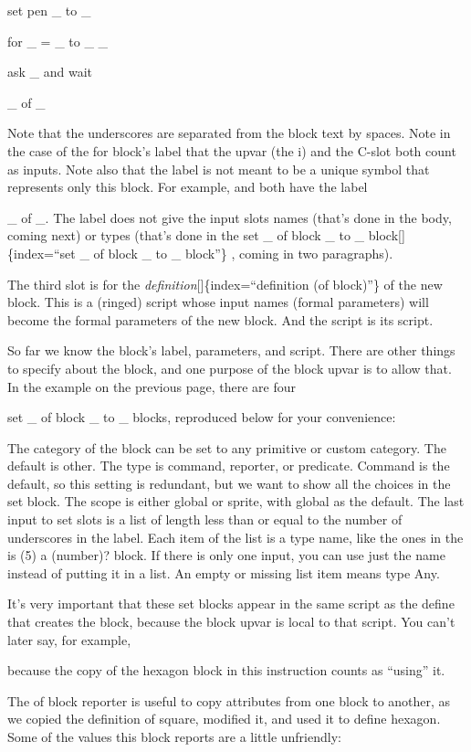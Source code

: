 \documentclass[
  letterpaper,
]{book}
\begin{document}
set pen \_ to \_

for \_ = \_ to \_ \_

ask \_ and wait

\_ of \_

Note that the underscores are separated from the block text by spaces.
Note in the case of the for block's label that the upvar (the i) and the
C-slot both count as inputs. Note also that the label is not meant to be
a unique symbol that represents only this block. For example, and both
have the label

\_ of \_. The label does not give the input slots names (that's done in
the body, coming next) or types (that's done in the set \_ of block \_
to \_ block{[}{]}\{index=``set \_ of block \_ to \_ block''\} , coming
in two paragraphs).

The third slot is for the \emph{definition}{[}{]}\{index=``definition
(of block)''\} of the new block. This is a (ringed) script whose input
names (formal parameters) will become the formal parameters of the new
block. And the script is its script.

So far we know the block's label, parameters, and script. There are
other things to specify about the block, and one purpose of the block
upvar is to allow that. In the example on the previous page, there are
four

set \_ of block \_ to \_ blocks, reproduced below for your convenience:

The category of the block can be set to any primitive or custom
category. The default is other. The type is command, reporter, or
predicate. Command is the default, so this setting is redundant, but we
want to show all the choices in the set block. The scope is either
global or sprite, with global as the default. The last input to set
slots is a list of length less than or equal to the number of
underscores in the label. Each item of the list is a type name, like the
ones in the is (5) a (number)? block. If there is only one input, you
can use just the name instead of putting it in a list. An empty or
missing list item means type Any.

It's very important that these set blocks appear in the same script as
the define that creates the block, because the block upvar is local to
that script. You can't later say, for example,

because the copy of the hexagon block in this instruction counts as
``using'' it.

The of block reporter is useful to copy attributes from one block to
another, as we copied the definition of square, modified it, and used it
to define hexagon. Some of the values this block reports are a little
unfriendly:
\end{document}
